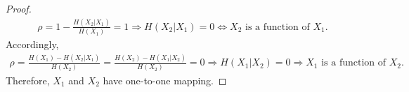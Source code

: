 \documentclass{assignment}
\begin{document}
\begin{sol}
\begin{itemize}
        \begin{proof}
            \begin{align}
                \rho=1-\frac{H(X_2\vert X_1)}{H(X_1)}=1\Longrightarrow H(X_2\vert X_1)=0\Longleftrightarrow X_2\text{ is a function of }X_1.
            \end{align}
            Accordingly,
            \begin{align}
                \rho=\frac{H(X_1)-H(X_2\vert X_1)}{H(X_2)}=\frac{H(X_2)-H(X_1\vert X_2)}{H(X_2)}=0\Rightarrow H(X_1\vert X_2)=0\Longrightarrow X_1\text{ is a function of }X_2.
            \end{align}
            Therefore, $X_1$ and $X_2$ have one-to-one mapping.
        \end{proof}
    \end{itemize}
\end{sol}
\end{document}
